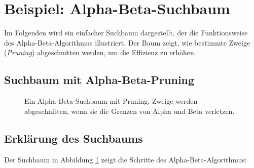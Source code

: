 \section*{Beispiel: Alpha-Beta-Suchbaum}

Im Folgenden wird ein einfacher Suchbaum dargestellt, der die Funktionsweise des Alpha-Beta-Algorithmus illustriert. Der Baum zeigt, wie bestimmte Zweige (\textit{Pruning}) abgeschnitten werden, um die Effizienz zu erhöhen.

\subsection*{Suchbaum mit Alpha-Beta-Pruning}

\begin{figure}[h!]
	\centering
	\caption{Ein Alpha-Beta-Suchbaum mit Pruning. Zweige werden abgeschnitten, wenn sie die Grenzen von Alpha und Beta verletzen.}
	\label{fig:alphabeta-example}
\end{figure}

\subsection*{Erklärung des Suchbaums}

Der Suchbaum in Abbildung \ref{fig:alphabeta-example} zeigt die Schritte des Alpha-Beta-Algorithmus:

